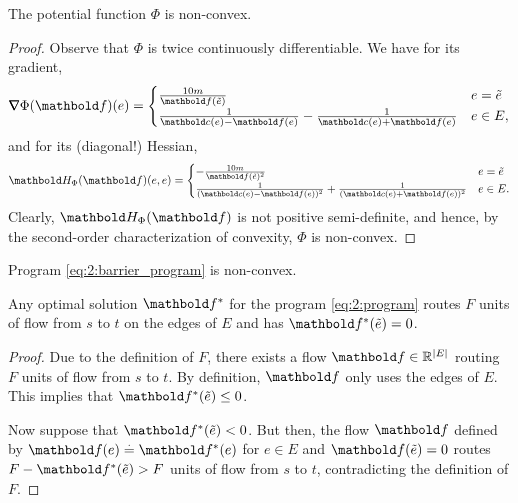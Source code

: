 \documentclass{tufte-handout}
\newcommand{\etil}{\Tilde{e}}
\begin{document}
\begin{lem}
The potential function $\Phi$ is non-convex.
\end{lem}
\begin{proof}
Observe that $\Phi$ is twice continuously differentiable. We have for its gradient, \begin{align}
    \grad \Phi(\vf)(e) = \begin{cases}
        \frac{10 m}{\vf(\etil)} & e = \etil \\
        \frac{1}{\vc(e) - \vf(e)} - \frac{1}{\vc(e) + \vf(e)} & e \in E, \\
    \end{cases} \label{eq:2:gradient}
\end{align} and for its (diagonal!) Hessian, \begin{align}
    \mH_\Phi(\vf)(e,e) = \begin{cases}
        -\frac{10 m}{\vf(\etil)^2} & e = \etil \\
        \frac{1}{(\vc(e) - \vf(e))^2} + \frac{1}{(\vc(e) + \vf(e))^2} & e \in E. \\
    \end{cases} \label{eq:2:hessian}
\end{align} Clearly, $\mH_\Phi(\vf)$ is not positive semi-definite, and hence, by the second-order characterization of convexity, $\Phi$ is non-convex.
\end{proof}

\begin{cor}
Program \eqref{eq:2:barrier_program} is non-convex.
\end{cor}

\begin{lem}
Any optimal solution $\s{\vf}$ for the program \eqref{eq:2:program} routes $F$ units of flow from $s$ to $t$ on the edges of $E$ and has $\s{\vf}(\etil) = 0$.
\end{lem}
\begin{proof}
Due to the definition of $F$, there exists a flow $\vf \in \R^{|E|}$ routing $F$ units of flow from $s$ to $t$. By definition, $\vf$ only uses the edges of $E$. This implies that $\s{\vf}(\etil) \leq 0$.

Now suppose that $\s{\vf}(\etil) < 0$. But then, the flow $\vf$ defined by $\vf(e) \defeq \s{\vf}(e)$ for $e \in E$ and $\vf(\etil) = 0$ routes $F - \s{\vf}(\etil) > F$ units of flow from $s$ to $t$, contradicting the definition of $F$.
\end{proof}
\end{document}
